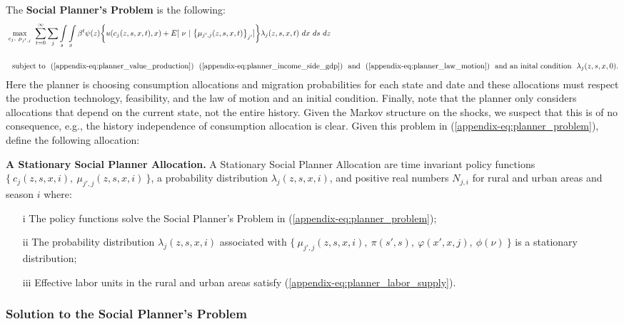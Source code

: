 \documentclass[12pt,pdftex]{article}
\begin{document}
\begin{onehalfspacing}
The \textbf{Social Planner's Problem} is the following:
{\small
\begin{align}
& \max\limits_{c_{j},\ \mu_{j',j}} \ \sum_{t=0}^{\infty}\sum_{j} \int\limits_{s} \int\limits_{x} \beta^{t} \psi(z) \bigg \{ u(c_{j}(z, s, x, t), x) + E[ \ \nu \ | \ \big\{\mu_{j',j}(z,s,x,t)\big\}_{j'}]  \bigg \} \lambda_{j}(z, s, x, t) \ dx \ ds \ dz \ \ \nonumber \\
\nonumber \\
& \ \ \mbox{subject to} \ \ (\ref{appendix-eq:planner_value_production}) \ \ (\ref{appendix-eq:planner_income_side_gdp}) \ \ \mbox{and} \ \ (\ref{appendix-eq:planner_law_motion}) \ \ \mbox{and an inital condition} \ \ \lambda_j(z, s, x,0).
\label{appendix-eq:planner_problem}
\end{align}}Here the planner is choosing consumption allocations and migration probabilities for each state and date and these allocations must respect the production technology, feasibility, and the law of motion and an initial condition. Finally, note that the planner only considers allocations that depend on the current state, not the entire history. Given the Markov structure on the shocks, we suspect that this is of no consequence, e.g., the history independence of consumption allocation is clear. Given this problem in (\ref{appendix-eq:planner_problem}), define the following allocation:

\textbf{A Stationary Social Planner Allocation.}  A Stationary Social Planner Allocation are time invariant policy functions $\{\ c_{j}(z, s, x, i),\ \mu_{j',j}(z, s, x, i) \ \}$, a probability distribution $\lambda_{j}(z, s, x, i)$, and positive real numbers $N_{j,i}$ for rural and urban areas and season $i$ where:
\begin{itemize}
\item[i] The policy functions solve the Social Planner's Problem in (\ref{appendix-eq:planner_problem});
\item[ii] The probability distribution $\lambda_{j}(z, s, x, i)$ associated with $\{\ \mu_{j',j}(z, s, x, i), \ \pi(s',s), \ \varphi(x',x, j), \ \phi(\nu) \ \}$ is a stationary distribution;
\item[iii] Effective labor units in the rural and urban areas satisfy (\ref{appendix-eq:planner_labor_supply}).
\end{itemize}

\subsubsection{Solution to the Social Planner's Problem}


\end{onehalfspacing}
\end{document}
